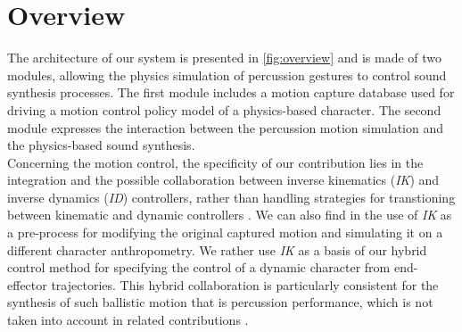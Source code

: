 



	\section{Overview}
	\label{sec:Synthesis_Overview}

The architecture of our system is presented in \myfigname \ref{fig:overview} and is made of two modules, allowing the physics simulation of percussion gestures to control sound synthesis processes. The first module includes a motion capture database used for driving a motion control policy model of a physics-based character. The second module expresses the interaction between the percussion motion simulation and the physics-based sound synthesis.\\

Concerning the motion control, the specificity of our contribution lies in the integration and the possible collaboration between inverse kinematics (\emph{IK}) and inverse dynamics (\emph{ID}) controllers, rather than handling strategies for transtioning between kinematic and dynamic controllers . We can also find in  the use of \emph{IK} as a pre-process for modifying the original captured motion and simulating it on a different character anthropometry. We rather use \emph{IK} as a basis of our hybrid control method for specifying the control of a dynamic character from end-effector trajectories. This hybrid collaboration is particularly consistent for the synthesis of such ballistic motion that is percussion performance, which is not taken into account in related contributions  .\\

